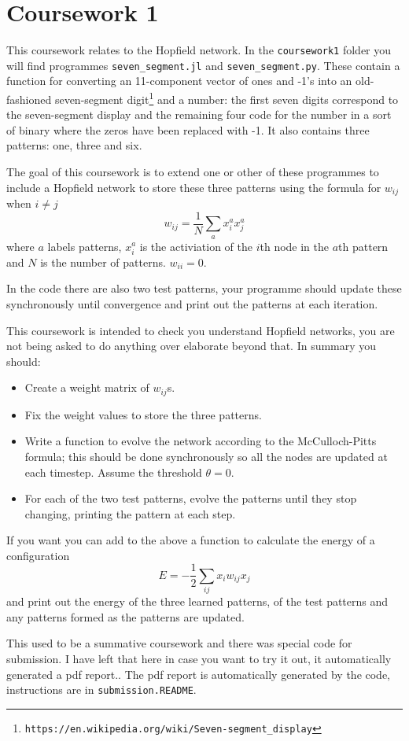 \documentclass[12pt]{article}
\begin{document}
\section*{Coursework 1}

This coursework relates to the Hopfield network. In the \texttt{coursework1}
folder you will find programmes \texttt{seven\_segment.jl} and
\texttt{seven\_segment.py}. These contain a function for converting an
11-component vector of ones and -1's into an old-fashioned
seven-segment digit\footnote{\texttt{https://en.wikipedia.org/wiki/Seven-segment\_display}} and a number: the first seven digits correspond to
the seven-segment display and the remaining four code for the number
in a sort of binary where the zeros have been replaced with -1. It
also contains three patterns: one, three and six.

The goal of this coursework is to extend one or other of these
programmes to include a Hopfield network to store these three
patterns using the formula for $w_{ij}$ when $i\not=j$
\begin{equation}
w_{ij}=\frac{1}{N}\sum_a x_i^a x_j^a
\end{equation}
where $a$ labels patterns, $x_i^a$ is the activiation of the $i$th
node in the $a$th pattern and $N$ is the number of
patterns. $w_{ii}=0$.

In the code there are also two test patterns, your programme should
update these synchronously until convergence and print out the
patterns at each iteration. 


This coursework is intended to check you understand Hopfield networks,
you are not being asked to do anything over elaborate beyond that. In
summary you should:
\begin{itemize}
\item Create a weight matrix of $w_{ij}$s.
\item Fix the weight values to store the three patterns.
\item Write a function to evolve the network according to the
  McCulloch-Pitts formula; this should be done synchronously so all the nodes are updated at each timestep. Assume the threshold $\theta=0$.
\item For each of the two test patterns, evolve the patterns until they stop changing, printing the pattern at each step.
\end{itemize}

If you want you can add to the above a function to calculate the energy of a configuration
\begin{equation}
E=-\frac{1}{2}\sum_{ij} x_i w_{ij} x_j
\end{equation}
and print out the energy of the three learned patterns, of the test
patterns and any patterns formed as the patterns are updated.

This used to be a summative coursework and there was special code for submission. I have left that here in case you want to try it out, it automatically generated a pdf report.. The pdf report
is automatically generated by the code, instructions are in
\texttt{submission.README}.
\end{document}
